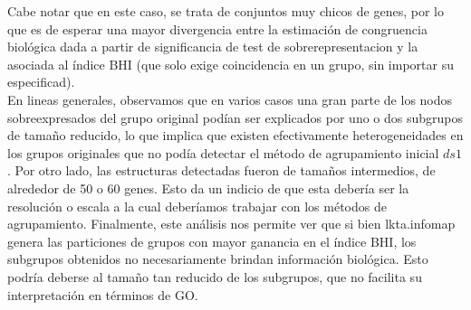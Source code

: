 Cabe notar que en este caso, se trata de conjuntos muy chicos de genes, por lo que es de esperar una mayor divergencia entre la estimación de congruencia biológica dada a partir de significancia de test de sobrerepresentacion y la asociada al índice BHI (que solo exige coincidencia en un grupo, sin importar su especificad).\\
En lineas generales, observamos que en varios casos una gran parte de los nodos sobreexpresados del grupo original podían ser explicados por uno o dos subgrupos de tamaño reducido, lo que implica que existen efectivamente heterogeneidades en los grupos originales que no podía detectar el método de agrupamiento inicial $ds1$. Por otro lado, las estructuras detectadas fueron de tamaños intermedios, de alrededor de 50 o 60 genes. Esto da un indicio de que esta debería ser la resolución o escala a la cual deberíamos trabajar con los métodos de agrupamiento. Finalmente, este análisis nos permite ver que si bien lkta.infomap genera las particiones de grupos con mayor ganancia en el índice BHI, los subgrupos obtenidos no necesariamente brindan información biológica. Esto podría deberse al tamaño tan reducido de los subgrupos, que no facilita su interpretación en términos de GO.




